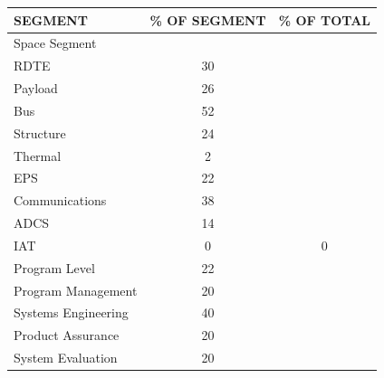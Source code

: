 \begin{table}[htbp]
	\centering

\begin{tabular}{p{10cm} | c | c }

   \textbf{SEGMENT} & \textbf{\% OF SEGMENT} & \textbf{\% OF TOTAL} \\ \hline \hline

Space Segment &          &          \\ \hline

      \hspace{1.0cm}RDTE &         30 &          \\ \hline

   \hspace{2.0cm}Payload &         26 &          \\

       \hspace{2.0cm}Bus &         52 &         \\ \hline

 \hspace{2.5cm}Structure &         24&          \\

  \hspace{2.5cm}Thermal &         2 &          \\

      \hspace{2.5cm}EPS &         22 &          \\

\hspace{2.5cm}Communications &         38 &          \\

      \hspace{2.5cm}ADCS &         14 &          \\ \hline

       \hspace{2.0cm}IAT &         0 &         0 \\

 \hspace{2.0cm}Program Level &         22 &          \\ \hline
 \hspace{2.5cm}Program Management &         20 &          \\
 \hspace{2.5cm}Systems Engineering &         40 &          \\
 \hspace{2.5cm}Product Assurance &         20 &          \\
 \hspace{2.5cm}System Evaluation &         20 &          \\ \hline


\end{tabular}
\end{table}
